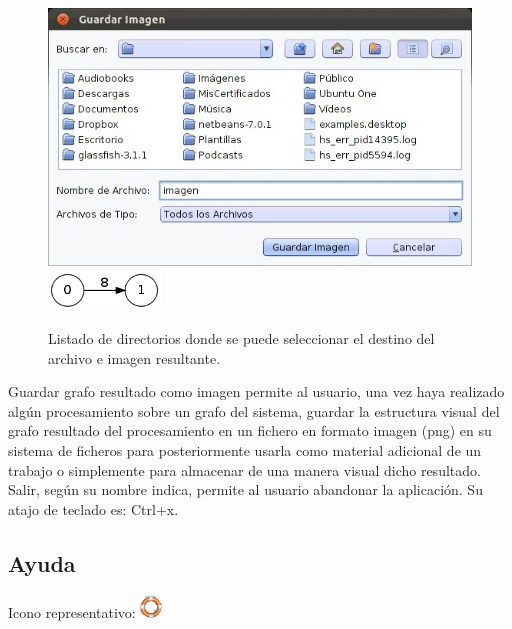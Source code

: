 \begin{figure}[H]
\begin{center}
\includegraphics[width=13cm]{./imagenes_documentacion/imagen_guardar_imagen.jpeg}
\includegraphics[width=3cm]{./imagenes_documentacion/grafo.png}
\caption{Listado de directorios donde se puede seleccionar el destino del archivo e imagen resultante.}
\end{center}
\end{figure}

Guardar grafo resultado como imagen permite al usuario, una vez haya realizado algún procesamiento sobre un grafo del sistema, guardar la estructura visual del grafo resultado del procesamiento en un fichero en formato imagen (png) en su sistema de ficheros para posteriormente usarla como material adicional de un trabajo o simplemente para almacenar de una manera visual dicho resultado. \\

Salir, según su nombre indica, permite al usuario abandonar la aplicación. Su atajo de teclado es: Ctrl+x. \\
\subsection{Ayuda}

Icono representativo: \includegraphics[scale=.2]{./imagenes_documentacion/ayuda.png} \\

